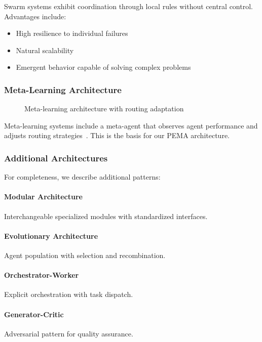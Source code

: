 \documentclass[11pt,a4paper]{article}
\theoremstyle{definition}
\theoremstyle{remark}
\newcommand{\pema}{\textsc{PEMA}\xspace}
\begin{document}
Swarm systems exhibit coordination through local rules without central control. Advantages include:
\begin{itemize}
    \item High resilience to individual failures
    \item Natural scalability
    \item Emergent behavior capable of solving complex problems
\end{itemize}

\subsubsection{Meta-Learning Architecture}

\begin{figure}[H]
    \centering
    
    \caption{Meta-learning architecture with routing adaptation}
    \label{fig:meta-learning}
\end{figure}

Meta-learning systems include a meta-agent that observes agent performance and adjusts routing strategies~\cite{wu2023autogen,hong2023metagpt}. This is the basis for our \pema architecture.

\subsubsection{Additional Architectures}

For completeness, we describe additional patterns:

\paragraph{Modular Architecture} Interchangeable specialized modules with standardized interfaces.

\paragraph{Evolutionary Architecture} Agent population with selection and recombination.

\paragraph{Orchestrator-Worker} Explicit orchestration with task dispatch.

\paragraph{Generator-Critic} Adversarial pattern for quality assurance.
\end{document}
